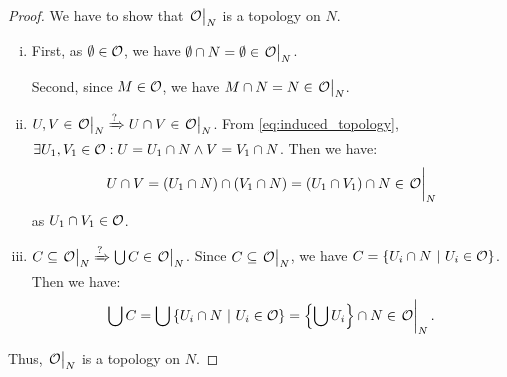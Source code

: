 \begin{proof}
	We have to show that \(\eval{\CO}_N\) is a topology on \(N\).
	\begin{enumerate}[(i)]
		\item First, as \(\emptyset \in \mathcal{O}\), we have \(\0 \cap N = \0 \in \eval{\CO}_N\).

		      Second, since \(M \in \mathcal{O}\), we have \(M \cap N = N \in \eval{\CO}_N\).

		\item \(U, V \in \eval{\CO}_N \xRightarrow{?} U \cap V \in \eval{\CO}_N\). From \eqref{eq:induced_topology}, \(\exists U_1, V_1 \in \mathcal{O}: U = U_1 \cap N \land V = V_1 \cap N\). Then we have:
		      \begin{equation*}
			      U \cap V = (U_1 \cap N) \cap (V_1 \cap N) = (U_1 \cap V_1) \cap N \in \eval{\CO}_N
		      \end{equation*}
		      as \(U_1 \cap V_1 \in \mathcal{O}\).

		\item \(C \subseteq \eval{\CO}_N \xRightarrow{?} \bigcup C\in\eval{\CO}_N\). Since \(C \subseteq \eval{\CO}_N\), we have \(C = \qty{U_i \cap N \ \middle|\ U_i \in \mathcal{O}}\). Then we have:
		      \begin{equation*}
			      \bigcup C = \bigcup \qty{U_i \cap N \mid U_i \in \CO} = \qty{\bigcup U_i} \cap N \in \eval{\CO}_N.
		      \end{equation*}
	\end{enumerate}
	Thus, \(\eval{\CO}_N\) is a topology on \(N\).
\end{proof}

